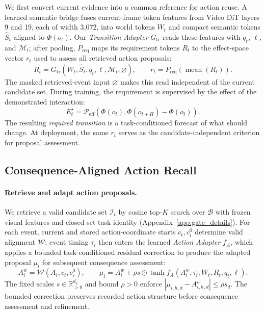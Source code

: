 We first convert current evidence into a common reference for action reuse.
A learned semantic bridge fuses current-frame token features from Video DiT layers 9 and 19, each of width 3,072, into world tokens $W_t$ and compact semantic tokens $\widehat S_t$ aligned to $\Phi(o_t)$.
Our \emph{Transition Adapter} $G_{\mathrm{tr}}$ reads these features with $q_t$, $\ell$, and $\mathcal M_t$; after pooling, $P_{\mathrm{req}}$ maps its requirement tokens $R_t$ to the effect-space vector $r_t$ used to assess all retrieved action proposals:
\begin{equation}
 R_t=G_{\mathrm{tr}}(W_t,\widehat S_t,q_t,\ell,\mathcal M_t;\varnothing),
 \qquad r_t=P_{\mathrm{req}}\!\left(\operatorname{mean}(R_t)\right).
 \label{eq:required}
\end{equation}
The masked retrieved-event input $\varnothing$ makes this read independent of the current candidate set.
During training, the requirement is supervised by the effect of the demonstrated interaction:
\begin{equation}
 E_t^\star=\mathcal P_{\mathrm{eff}}\!\left(\Phi(o_t),\Phi(o_{t+H})-\Phi(o_t)\right).
 \label{eq:effect_target}
\end{equation}
The resulting \emph{required transition} is a task-conditioned forecast of what should change. At deployment, the same $r_t$ serves as the candidate-independent criterion for proposal assessment.

\subsection{Consequence-Aligned Action Recall}
\label{sec:compatibility}

\paragraph{Retrieve and adapt action proposals.}
We retrieve a valid candidate set $\mathcal I_t$ by cosine top-$K$ search over $\mathcal B$ with frozen visual features and closed-set task identity (Appendix~\ref{app:gate_details}).
For each event, current and stored action-coordinate starts $c_t,c_i^0$ determine valid alignment $\mathcal W$; event timing $\tau_i$ then enters the learned \textit{Action Adapter} $f_A$, which applies a bounded task-conditioned residual correction to produce the adapted proposal $\mu_i$ for subsequent consequence assessment:
\begin{equation}
 A_i^w=\mathcal W(A_i,c_t,c_i^0),\qquad
 \mu_i=A_i^w+\rho s\odot\tanh f_A(A_i^w,\tau_i,W_t,R_t,q_t,\ell).
 \label{eq:adapter}
\end{equation}
The fixed scales $s\in\mathbb R_{>0}^{d_a}$ and bound $\rho>0$ enforce $|\mu_{i,h,d}-A^w_{i,h,d}|\leq\rho s_d$.
The bounded correction preserves recorded action structure before consequence assessment and refinement.

